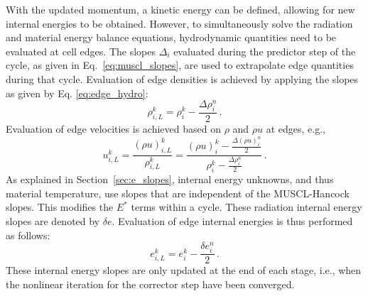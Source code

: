 \documentclass[preprint,12pt]{elsarticle}
\newcommand{\pep}{\, .}
\newcommand{\iL}{_{i,L}}
\begin{document}
With the updated momentum, a kinetic energy can be defined, allowing for new internal
energies to be obtained.  However, to simultaneously solve the radiation and material energy balance equations,
hydrodynamic quantities need to be evaluated at cell edges. The slopes $\Delta_i$
evaluated during the predictor step of the cycle, as given in Eq.~\eqref{eq:muscl_slopes}, are used
to extrapolate edge quantities during that cycle.  Evaluation of edge
densities is achieved by applying the slopes as given by Eq. \eqref{eq:edge_hydro}:
\begin{equation}
   \rho\iL^k = \rho_i^k - \frac{\Delta\rho_i^n}{2} \pep
\end{equation}
Evaluation of edge velocities is
achieved based on $\rho$ and $\rho u$ at edges, e.g.,
\begin{equation}
   u\iL^k = \frac{(\rho u)\iL^k}{\rho\iL^k}
          = \frac{(\rho u)_i^k - \frac{\Delta(\rho u)_i^n}{2}}
                 {\rho_i^k - \frac{\Delta\rho_i^n}{2}} \pep
\end{equation}
As explained in Section~\ref{sec:e_slopes}, internal energy unknowns, and thus material
temperature, use slopes that are independent of the MUSCL-Hancock slopes.  This modifies
the $E^*$ terms within a cycle.
These radiation internal energy slopes are denoted by $\delta e$. Evaluation
of edge internal energies is thus performed as follows:
\begin{equation}
   e\iL^k = e_i^k - \frac{\delta e_i^n}{2} \pep
\end{equation}
 These internal energy slopes are only updated at the end of each stage, i.e.,
when the nonlinear iteration for the corrector step have been converged.
\end{document}
